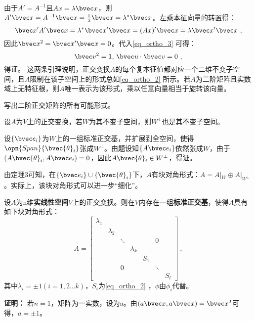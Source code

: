 由于$A'=A^{-1}$且$Ax=\lambda \bvec x$，则$A'\bvec x=A^{-1}\bvec x=\frac{1}{\lambda}\bvec x=\lambda^* \bvec x$。左乘本征向量的转置得：
\begin{equation}
\bvec x'A'\bvec x=\lambda^* \bvec x'\bvec x=(Ax)'\bvec x=\lambda \bvec x'\bvec x~,
\end{equation}
因此$\bvec x^2=\bvec x'\bvec x=0$。代入\autoref{eq_ortho_3} 可得：
\begin{equation}
\bvec v^2=1,\,\bvec u\cdot \bvec v=0~,
\end{equation}
得证。
这两条引理说明，正交变换$A$的每个复本征值都对应一个二维不变子空间，且$A$限制在该子空间上的形式总如\autoref{eq_ortho_2} 所示。若$A$为二阶矩阵且实数域上无特征根，则$A$唯一表示为该形式，乘以任意向量相当于旋转该向量。
\begin{exercise}{}
写出二阶正交矩阵的所有可能形式。
\end{exercise}
\begin{lemma}{}\label{lem_ortho_2}
设$A$为$V$上的正交变换，若$W$为其不变子空间，则$W^{\bot}$也是其不变子空间。
\end{lemma}
设$\{\bvec e_i\}$为$W$上的一组标准正交基，并扩展到全空间，使得$\opn{Span}\{\bvec {\theta}_i\}$张成$W^{\bot}$。由题设知$\{A\bvec e_i\}$依然张成$W$，由于$(A\bvec {\theta}_i,A\bvec e_i)=0$，因此$A\bvec{\theta}_i\in W^{\bot}$，得证。

由定理3可知，在$\{\bvec e_i\}\cup\{\bvec {\theta}_i\}$下，$A$有块对角形式：$A=A|_W\oplus A|_{W^{\bot}}$。实际上，该块对角形式可以进一步“细化”。
\begin{theorem}{}
设$A$为n维\textbf{实线性空间}$V$上的正交变换。则在$V$内存在一组\textbf{标准正交基}，使得$A$具有如下块对角形式：
\begin{equation}
A=\left[\begin{array}{lllllll}
\lambda_1 & & & & & & \\
& \lambda_2 & & & & & \\
& & \ddots & & & 0 & \\
& & & \lambda_k & & & \\
& & & & S_1 & & \\
& & 0 & & & \ddots & \\
& & & & & & S_l
\end{array}\right]~,
\end{equation}
其中$\lambda_i=\pm 1(i=1,2...k)$，$S_i$为\autoref{eq_ortho_2} ，$\phi$由$\phi_i$代替。
\end{theorem}
\textbf{证明：}
若$n=1$，矩阵为一实数，设为a。由$(a\bvec x,a\bvec x)=\bvec x^2$可得，$a=\pm 1$。

